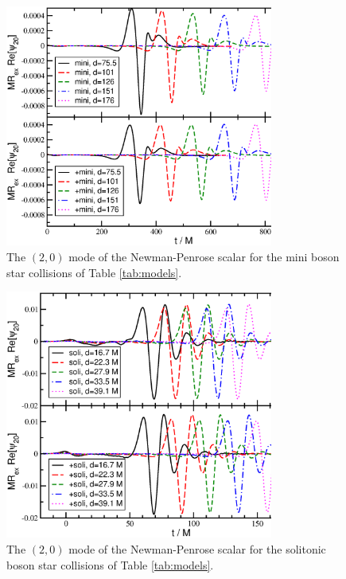 \documentclass[]{iopart}
\begin{document}
%
\begin{figure}
    \centering
    \includegraphics[width=250pt]{mini_psi20.eps}
    \caption{
    The $(2,0)$ mode of the Newman-Penrose scalar for the mini boson
    star collisions of Table \ref{tab:models}.
    }
    \label{fig:mini_psi20}
\end{figure}
%
%
\begin{figure}
    \centering
    \includegraphics[width=250pt]{soli_psi20.eps}
    \caption{
    The $(2,0)$ mode of the Newman-Penrose scalar for the solitonic
    boson star collisions of Table \ref{tab:models}.
    }
    \label{fig:soli_psi20}
\end{figure}
%

\end{document}
